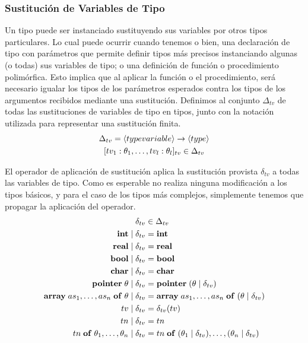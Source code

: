 \subsubsection{Sustitución de Variables de Tipo}

Un tipo puede ser instanciado sustituyendo sus variables por otros tipos particulares.
Lo cual puede ocurrir cuando tenemos o bien, una declaración de tipo con parámetros que permite definir tipos más precisos instanciando algunas (o todas) sus variables de tipo; o una definición de función o procedimiento polimórfica.
Esto implica que al aplicar la función o el procedimiento, será necesario igualar los tipos de los parámetros esperados contra los tipos de los argumentos recibidos mediante una sustitución.
Definimos al conjunto $\Delta_{tv}$ de todas las sustituciones de variables de tipo en tipos, junto con la notación utilizada para representar una sustitución finita.
\begin{gather*}
\Delta_{tv} = \langle typevariable \rangle \rightarrow \langle type \rangle
\\
[tv_1 : \theta_1, \ldots, tv_l : \theta_l]_{tv} \in \Delta_{tv}
\end{gather*}

El operador de aplicación de sustitución aplica la sustitución provista $\delta_{tv}$ a todas las variables de tipo.
Como es esperable no realiza ninguna modificación a los tipos básicos, y para el caso de los tipos más complejos, simplemente tenemos que propagar la aplicación del operador.
\begin{align*}
\delta_{tv}
&\in
\Delta_{tv}
\\
\mathbf{int} \mid \delta_{tv}
&=
\mathbf{int}
\\
\mathbf{real} \mid \delta_{tv}
&=
\mathbf{real}
\\
\mathbf{bool} \mid \delta_{tv}
&=
\mathbf{bool}
\\
\mathbf{char} \mid \delta_{tv}
&=
\mathbf{char}
\\
\mathbf{pointer} \; \theta \mid \delta_{tv}
&=
\mathbf{pointer} \; (\theta \mid \delta_{tv})
\\
\mathbf{array} \; as_1, \ldots, as_n \; \mathbf{of} \; \theta \mid \delta_{tv}
&=
\mathbf{array} \; as_1, \ldots, as_n \; \mathbf{of} \; (\theta \mid \delta_{tv})
\\
tv \mid \delta_{tv}
&=
\delta_{tv}(tv)
\\
tn \mid \delta_{tv}
&=
tn
\\
tn \; \mathbf{of} \; \theta_1, \ldots, \theta_n \mid \delta_{tv}
&=
tn \; \mathbf{of} \; (\theta_1 \mid \delta_{tv}), \ldots, (\theta_n \mid \delta_{tv})
\end{align*}

